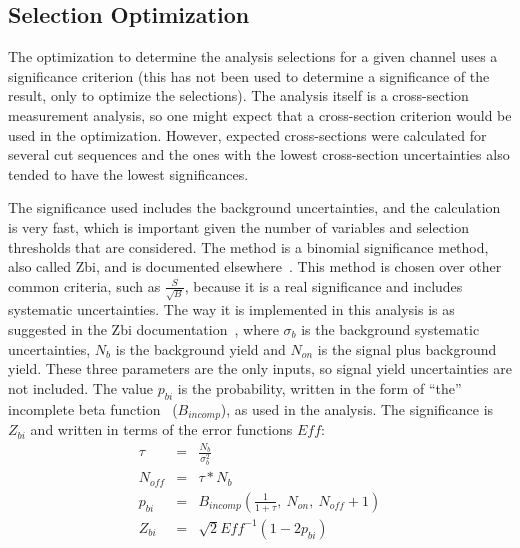 \subsection{Selection Optimization}\label{sec:optimization}
The optimization to determine the analysis selections for a given channel uses a significance criterion (this has not been used to determine a significance of the result, only to optimize the selections).  The analysis itself is a cross-section measurement analysis, so one might expect that a cross-section criterion would be used in the optimization.  However, expected cross-sections were calculated for several cut sequences and the ones with the lowest cross-section uncertainties also tended to have the lowest significances.

The significance used includes the background uncertainties, and the calculation is very fast, which is important given the number of  variables and selection thresholds that are considered.  The method is a binomial significance method, also called Zbi, and is documented elsewhere~\cite{Zbi}.  This method is chosen over other common criteria, such as $\frac{S}{\sqrt{B}}$, because it is a real significance and includes systematic uncertainties.  The way it is implemented in this analysis is as suggested in the Zbi documentation~\cite{Zbi}, where $\sigma_b$ is the background systematic uncertainties, $N_b$ is the background yield and $N_{on}$ is the signal plus background yield.  These three parameters are the only inputs, so signal yield uncertainties are not included.  The value $p_{bi}$ is the probability, written in the form of ``the'' incomplete beta function~\cite{BetaIncomp} ($B_{incomp}$), as used in the analysis.  The significance is $Z_{bi}$ and written in terms of the error functions $Eff$:
\begin{eqnarray*}
\tau &=& \frac{N_b}{\sigma_b^2} \\
N_{off} &=& \tau*N_b \\
p_{bi} &=& B_{incomp}(\frac{1}{1+\tau},~N_{on},~N_{off}+1) \\
Z_{bi} &=& \sqrt{2}Eff^{-1}(1-2p_{bi}) \\
\end{eqnarray*}
%
